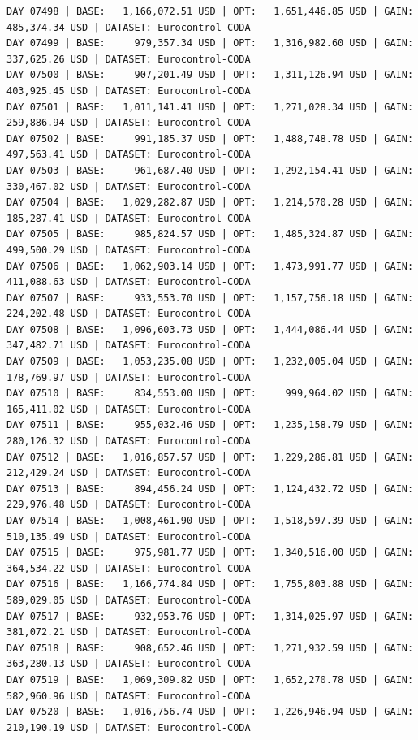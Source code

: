 \documentclass[11pt,a4paper]{article}
\begin{document}
\begin{verbatim}
DAY 07498 | BASE:   1,166,072.51 USD | OPT:   1,651,446.85 USD | GAIN: 485,374.34 USD | DATASET: Eurocontrol-CODA
DAY 07499 | BASE:     979,357.34 USD | OPT:   1,316,982.60 USD | GAIN: 337,625.26 USD | DATASET: Eurocontrol-CODA
DAY 07500 | BASE:     907,201.49 USD | OPT:   1,311,126.94 USD | GAIN: 403,925.45 USD | DATASET: Eurocontrol-CODA
DAY 07501 | BASE:   1,011,141.41 USD | OPT:   1,271,028.34 USD | GAIN: 259,886.94 USD | DATASET: Eurocontrol-CODA
DAY 07502 | BASE:     991,185.37 USD | OPT:   1,488,748.78 USD | GAIN: 497,563.41 USD | DATASET: Eurocontrol-CODA
DAY 07503 | BASE:     961,687.40 USD | OPT:   1,292,154.41 USD | GAIN: 330,467.02 USD | DATASET: Eurocontrol-CODA
DAY 07504 | BASE:   1,029,282.87 USD | OPT:   1,214,570.28 USD | GAIN: 185,287.41 USD | DATASET: Eurocontrol-CODA
DAY 07505 | BASE:     985,824.57 USD | OPT:   1,485,324.87 USD | GAIN: 499,500.29 USD | DATASET: Eurocontrol-CODA
DAY 07506 | BASE:   1,062,903.14 USD | OPT:   1,473,991.77 USD | GAIN: 411,088.63 USD | DATASET: Eurocontrol-CODA
DAY 07507 | BASE:     933,553.70 USD | OPT:   1,157,756.18 USD | GAIN: 224,202.48 USD | DATASET: Eurocontrol-CODA
DAY 07508 | BASE:   1,096,603.73 USD | OPT:   1,444,086.44 USD | GAIN: 347,482.71 USD | DATASET: Eurocontrol-CODA
DAY 07509 | BASE:   1,053,235.08 USD | OPT:   1,232,005.04 USD | GAIN: 178,769.97 USD | DATASET: Eurocontrol-CODA
DAY 07510 | BASE:     834,553.00 USD | OPT:     999,964.02 USD | GAIN: 165,411.02 USD | DATASET: Eurocontrol-CODA
DAY 07511 | BASE:     955,032.46 USD | OPT:   1,235,158.79 USD | GAIN: 280,126.32 USD | DATASET: Eurocontrol-CODA
DAY 07512 | BASE:   1,016,857.57 USD | OPT:   1,229,286.81 USD | GAIN: 212,429.24 USD | DATASET: Eurocontrol-CODA
DAY 07513 | BASE:     894,456.24 USD | OPT:   1,124,432.72 USD | GAIN: 229,976.48 USD | DATASET: Eurocontrol-CODA
DAY 07514 | BASE:   1,008,461.90 USD | OPT:   1,518,597.39 USD | GAIN: 510,135.49 USD | DATASET: Eurocontrol-CODA
DAY 07515 | BASE:     975,981.77 USD | OPT:   1,340,516.00 USD | GAIN: 364,534.22 USD | DATASET: Eurocontrol-CODA
DAY 07516 | BASE:   1,166,774.84 USD | OPT:   1,755,803.88 USD | GAIN: 589,029.05 USD | DATASET: Eurocontrol-CODA
DAY 07517 | BASE:     932,953.76 USD | OPT:   1,314,025.97 USD | GAIN: 381,072.21 USD | DATASET: Eurocontrol-CODA
DAY 07518 | BASE:     908,652.46 USD | OPT:   1,271,932.59 USD | GAIN: 363,280.13 USD | DATASET: Eurocontrol-CODA
DAY 07519 | BASE:   1,069,309.82 USD | OPT:   1,652,270.78 USD | GAIN: 582,960.96 USD | DATASET: Eurocontrol-CODA
DAY 07520 | BASE:   1,016,756.74 USD | OPT:   1,226,946.94 USD | GAIN: 210,190.19 USD | DATASET: Eurocontrol-CODA

\end{verbatim}
\end{document}
